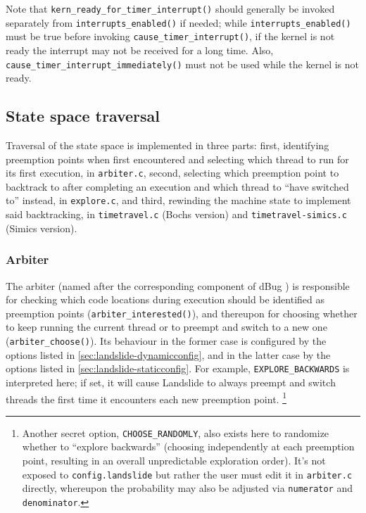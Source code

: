 Note that {\tt kern\_ready\_for\_timer\_interrupt()} should generally be invoked separately
from {\tt interrupts\_enabled()} if needed;
while {\tt interrupts\_enabled()} must be true before invoking {\tt cause\_timer\_interrupt()},
if the kernel is not ready the interrupt may not be received for a long time.
Also, {\tt cause\_timer\_interrupt\_immediately()} must not be used while the kernel is not ready.


\subsection{State space traversal}
\label{sec:landslide-statespace}

Traversal of the state space is implemented in three parts:
first, identifying preemption points when first encountered and selecting which thread to run for its first execution, in {\tt arbiter.c},
second, selecting which preemption point to backtrack to after completing an execution
and which thread to ``have switched to'' %
instead, in {\tt explore.c},
and third, rewinding the machine state to implement said backtracking,
in {\tt timetravel.c} (Bochs version) and {\tt timetravel-simics.c} (Simics version).

\subsubsection{Arbiter}
\label{sec:landslide-arbiter}

The arbiter (named after the corresponding component of dBug \cite{dbug-ssv})
is responsible for checking which code locations during execution should be identified as preemption points
({\tt arbiter\_interested()}),
and thereupon for choosing whether to keep running the current thread or to preempt and switch to a new one
({\tt arbiter\_choose()}).
Its behaviour in the former case is configured by the options listed in \cref{sec:landslide-dynamicconfig},
and in the latter case by the options listed in \cref{sec:landslide-staticconfig}.
For example, {\tt EXPLORE\_BACKWARDS} is interpreted here;
if set, it will cause Landslide to always preempt and switch threads the first time it encounters each new preemption point.%
\footnote{Another secret option, {\tt CHOOSE\_RANDOMLY},
also exists here to randomize whether to ``explore backwards''
(choosing independently at each preemption point, resulting in an overall unpredictable exploration order).
It's not exposed to {\tt config.landslide} but rather the user must edit it in {\tt arbiter.c} directly,
whereupon the probability may also be adjusted via {\tt numerator} and {\tt denominator}.}

